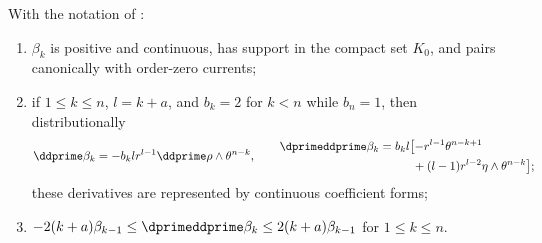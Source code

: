 \begin{lemma}
\label{lem:ch16-beta-properties}
With the notation of :
\begin{enumerate}
\item\label{itm:ch16-beta:reg}
 $\beta_k$ is positive and continuous, has support in the compact set
 $K_0$, and pairs canonically with order-zero currents;
\item\label{itm:ch16-beta:dd}
 if $1\leq k\leq n$, $l=k+a$, and
 $b_k=2$ for $k<n$ while $b_n=1$, then distributionally
 \[
 \ddprime\beta_k=-b_klr^{l-1}\ddprime\rho\wedge\theta^{n-k},
 \qquad
 \begin{aligned}
 \dprimeddprime\beta_k
   &=b_kl\bigl[-r^{l-1}\theta^{n-k+1}\\
   &\hspace{2.8em}+(l-1)r^{l-2}\eta\wedge\theta^{n-k}\bigr];
 \end{aligned}
 \]
 these derivatives are represented by continuous coefficient forms;
\item\label{itm:ch16-beta:sandwich}
 $-2(k+a)\beta_{k-1}\leq\dprimeddprime\beta_k
                 \leq2(k+a)\beta_{k-1}$ for
 $1\leq k\leq n$.
\end{enumerate}
\end{lemma}

